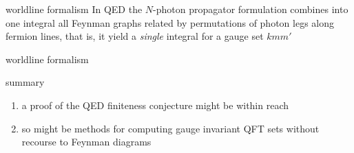 \begin{frame}{worldline formalism}
In QED the $N$-photon propagator formulation combines into one integral
all Feynman graphs related by permutations of photon legs along fermion
lines, that is, it yield a \emph{single} integral for a gauge set
$kmm'$
\end{frame}

\begin{frame}{worldline formalism}
\end{frame}

\begin{frame}{summary}
\begin{enumerate}
              \item
a proof of the QED finiteness conjecture might be within reach

              \item
so might be methods for computing gauge invariant QFT sets without
recourse to Feynman diagrams

\end{enumerate}

\vfill
\bigskip{}
\end{frame}




